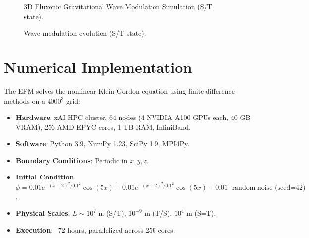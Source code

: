 \documentclass[11pt]{article}
\begin{document}
\begin{figure}[htbp]
    \centering
    \caption{3D Fluxonic Gravitational Wave Modulation Simulation (S/T state).}
    \label{fig:3Dwave}
\end{figure}

\begin{figure}[htbp]
    \centering
    \caption{Wave modulation evolution (S/T state).}
    \label{fig:wave_coherence}
\end{figure}

\section{Numerical Implementation}
The EFM solves the nonlinear Klein-Gordon equation using finite-difference methods on a \(4000^3\) grid:
\begin{itemize}
    \item \textbf{Hardware}: xAI HPC cluster, 64 nodes (4 NVIDIA A100 GPUs each, 40 GB VRAM), 256 AMD EPYC cores, 1 TB RAM, InfiniBand.
    \item \textbf{Software}: Python 3.9, NumPy 1.23, SciPy 1.9, MPI4Py.
    \item \textbf{Boundary Conditions}: Periodic in \(x, y, z\).
    \item \textbf{Initial Condition}: \(\phi = 0.01 e^{-(x-2)^2/0.1^2} \cos(5x) + 0.01 e^{-(x+2)^2/0.1^2} \cos(5x) + 0.01 \cdot \text{random noise (seed=42)}\).
    \item \textbf{Physical Scales}: \(L \sim 10^7 \text{ m}\) (S/T), \(10^{-9} \text{ m}\) (T/S), \(10^4 \text{ m}\) (S=T).
    \item \textbf{Execution}: ~72 hours, parallelized across 256 cores.
\end{itemize}
\end{document}
